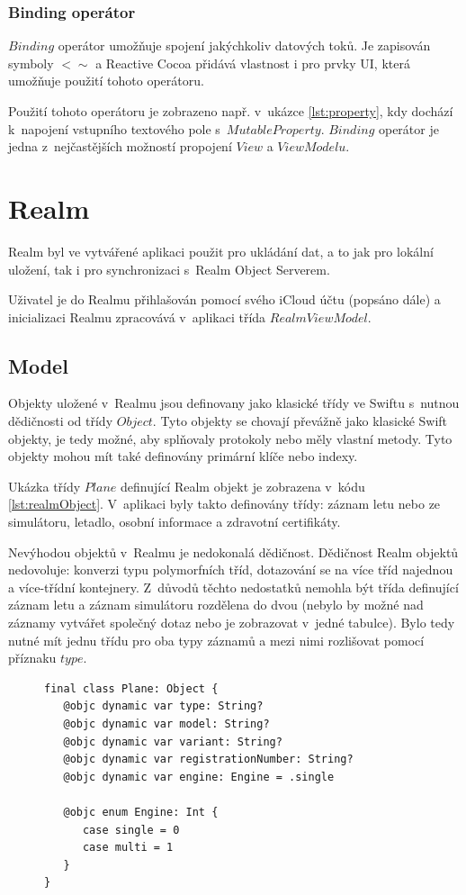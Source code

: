 \documentclass[thesis=M,czech]{FITthesis}[2012/06/26]
\begin{document}
\subsubsection{Binding operátor}
$Binding$ operátor umožňuje spojení jakýchkoliv datových toků. Je zapisován symboly $<\sim$  a Reactive Cocoa přidává vlastnost i pro prvky UI, která umožňuje použití tohoto operátoru. \cite{ReactiveCocoa}

Použití tohoto operátoru je zobrazeno např. v~ukázce \ref{lst:property}, kdy dochází k~napojení vstupního textového pole s~$MutableProperty$. $Binding$ operátor je jedna z~nejčastějších možností propojení $View$ a $ViewModelu$.

\section{Realm}
Realm byl ve vytvářené aplikaci použit pro ukládání dat, a to jak pro lokální uložení, tak i pro synchronizaci s~Realm Object Serverem. 

Uživatel je do Realmu přihlašován pomocí svého iCloud účtu (popsáno dále) a inicializaci Realmu zpracovává v~aplikaci třída $RealmViewModel$.
	
\subsection{Model}
Objekty uložené v~Realmu jsou definovany jako klasické třídy ve Swiftu s~nutnou dědičnosti od třídy $Object$. Tyto objekty se chovají převážně jako klasické Swift objekty, je tedy možné, aby splňovaly protokoly nebo měly vlastní metody. Tyto objekty mohou mít také definovány primární klíče nebo indexy. 

Ukázka třídy $Plane$ definující Realm objekt je zobrazena v~kódu \ref{lst:realmObject}. V~aplikaci byly takto definovány třídy: záznam letu nebo ze simulátoru, letadlo, osobní informace a zdravotní certifikáty.

Nevýhodou objektů v~Realmu je nedokonalá dědičnost. Dědičnost Realm objektů nedovoluje: konverzi typu polymorfních tříd, dotazování se na více tříd najednou a více-třídní kontejnery. \cite{realmDocs} Z~důvodů těchto nedostatků nemohla být třída definující záznam letu a záznam simulátoru rozdělena do dvou (nebylo by možné nad záznamy vytvářet společný dotaz nebo je zobrazovat v~jedné tabulce). Bylo tedy nutné mít jednu třídu pro oba typy záznamů a mezi nimi rozlišovat pomocí příznaku $type$.

\begin{figure}
\begin{minipage}{\linewidth}
\begin{lstlisting}[caption={Ukázka modelu Plane},label={lst:realmObject}]
final class Plane: Object {
   @objc dynamic var type: String?
   @objc dynamic var model: String?
   @objc dynamic var variant: String?
   @objc dynamic var registrationNumber: String?
   @objc dynamic var engine: Engine = .single
    
   @objc enum Engine: Int {
      case single = 0
      case multi = 1
   }
}
\end{lstlisting}
\end{minipage}
\end{figure}
\end{document}
